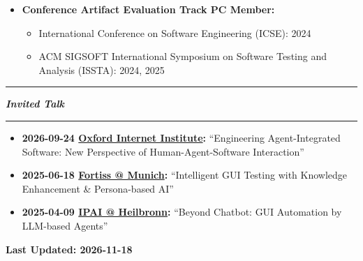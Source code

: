 \documentclass[12pt,a4paper]{article}
\newcommand{\cvsection}[1]{%
  \par\vspace{5pt}%
  \noindent\begin{minipage}{\linewidth}%
    \rule{\linewidth}{1.3pt}\par%
    \parbox[c][31pt][c]{\linewidth}{%
      \fontsize{20}{22}\selectfont\bfseries\itshape #1%
    }\par%
    \rule{\linewidth}{1.3pt}%
  \end{minipage}\par\nobreak\vspace{4pt}\nobreak%
}
\begin{document}
\begin{itemize}[leftmargin=1.25em,label=\textbullet,topsep=0pt,itemsep=1pt,parsep=0pt]
\begin{itemize}[leftmargin=1.25em,label=\textbullet,topsep=1pt,itemsep=1pt,parsep=0pt]
      \item ACM SIGSOFT International Symposium on Software Testing and Analysis (ISSTA): 2026
      \item International Joint Conferences on Artificial Intelligence (IJCAI): 2025, 2026
      \item IEEE International Conference on Software Maintenance and Evolution (ICSME): 2026, 2027
      \item ACM Conference on Intelligent User Interfaces (IUI): 2025, 2026, 2027
      \item Mining Software Repositories Conference (MSR): 2024, 2027
      \item International Workshop on Advances in Mobile App Analysis (A-Mobile): 2025
    \end{itemize}
  \item \textbf{Conference Artifact Evaluation Track PC Member:}
    \begin{itemize}[leftmargin=1.25em,label=\textbullet,topsep=1pt,itemsep=1pt,parsep=0pt]
      \item International Conference on Software Engineering (ICSE): 2024
      \item ACM SIGSOFT International Symposium on Software Testing and Analysis (ISSTA): 2024, 2025
    \end{itemize}
\end{itemize}

\cvsection{Invited Talk}
\begin{itemize}[leftmargin=1.25em,label=\textbullet,topsep=0pt,itemsep=2pt,parsep=0pt]
  \item \textbf{2026-09-24 \href{https://www.oii.ox.ac.uk/}{Oxford Internet Institute}:} ``Engineering Agent-Integrated Software: New Perspective of Human-Agent-Software Interaction''
  \item \textbf{2025-06-18 \href{https://www.fortiss.org/}{Fortiss @ Munich}:} ``Intelligent GUI Testing with Knowledge Enhancement \& Persona-based AI''
  \item \textbf{2025-04-09 \href{https://ip.ai/}{IPAI @ Heilbronn}:} ``Beyond Chatbot: GUI Automation by LLM-based Agents''
\end{itemize}

\vspace{12pt}
\hfill\textbf{Last Updated: 2026-11-18}
\end{document}
